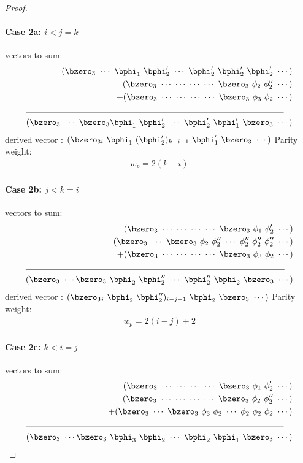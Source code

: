 \documentclass[11pt, oneside, dvipdfmx]{book}
\begin{document}
\begin{proof}
\paragraph{Case 2a: $i<j=k$\newline}
 vectors to sum:
\begin{align*}
(\bzero_3 ~\cdots~\bphi_1~\bphi'_2~\cdots~\bphi'_2~\bphi'_2~\bphi'_2~\cdots)\\
(\bzero_3~\cdots~\cdots~\cdots~\cdots~\bzero_3~\phi_2~\phi''_2~\cdots)\\
+(\bzero_3~\cdots~\cdots~\cdots~\cdots~\bzero_3~\phi_3~\phi_2~\cdots)\\
\cline{1-2}
(\bzero_{3}~\cdots~\bzero_{3}\bphi_1~\bphi'_2~\cdots~\bphi'_2~\bphi'_1~\bzero_3~\cdots)
\end{align*}
derived vector : $(\bzero_{3i}~\bphi_1~(\bphi'_2)_{k-i-1}~\bphi'_1~\bzero_3~\cdots)$
\newline
Parity weight: \begin{equation}
\begin{split}
w_p=2(k-i)
\end{split}
\end{equation}

\paragraph{Case 2b: $j<k=i$ \newline}
 vectors to sum:
\begin{align*}
(\bzero_3~\cdots~\cdots~\cdots~\cdots~\bzero_3~\phi_1~\phi'_2~\cdots)\\
(\bzero_3~\cdots~\bzero_3~\phi_2~\phi''_2~\cdots~\phi''_2~\phi''_2~\phi''_2~\cdots)\\
+(\bzero_3~\cdots~\cdots~\cdots~\cdots~\bzero_3~\phi_3~\phi_2~\cdots)\\
\cline{1-2}
(\bzero_{3}~\cdots\bzero_3~\bphi_2~\bphi''_2~\cdots~\bphi''_2~\bphi_2~\bzero_3~\cdots)
\end{align*}
derived vector : $(\bzero_{3j}~\bphi_2~\bphi''_2)_{i-j-1}~\bphi_2~\bzero_3~\cdots)$\newline
Parity weight: \begin{equation}
\begin{split}
w_p=2(i-j)+2
\end{split}
\end{equation}

\paragraph{Case 2c: $k<i=j$ \newline}
 vectors to sum:
\begin{align*}
(\bzero_3~\cdots~\cdots~\cdots~\cdots~\bzero_3~\phi_1~\phi'_2~\cdots)\\
(\bzero_3~\cdots~\cdots~\cdots~\cdots~\bzero_3~\phi_2~\phi''_2~\cdots)\\
+(\bzero_3~\cdots~\bzero_3~\phi_3~\phi_2~\cdots~\phi_2~\phi_2~\phi_2~\cdots)\\
\cline{1-2}
(\bzero_{3}~\cdots\bzero_3~\bphi_3~\bphi_2~\cdots~\bphi_2~\bphi_1~\bzero_3~\cdots)
\end{align*}



\end{proof}
\end{document}
